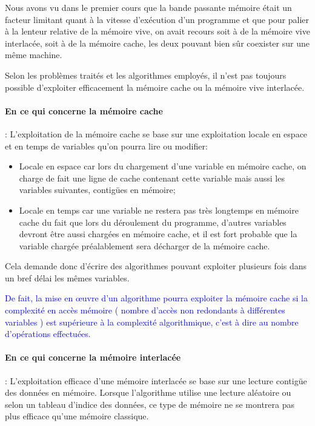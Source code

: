 \documentclass[fleqn,11pt]{article}
\begin{document}
Nous avons vu dans le premier cours que la bande passante mémoire était un facteur limitant quant à la vitesse d'exécution d'un
programme et que pour palier à la lenteur relative de la mémoire vive, on avait recours soit à de la mémoire vive interlacée, soit
à de la mémoire cache, les deux pouvant bien sûr coexister sur une même machine.

Selon les problèmes traités et les algorithmes employés, il n'est pas toujours possible d'exploiter efficacement la mémoire cache ou
la mémoire vive interlacée.

\paragraph{En ce qui concerne la mémoire cache} : L'exploitation de la mémoire cache se base sur une exploitation locale en espace et en temps
de variables qu'on pourra lire ou modifier:
\begin{itemize}
 \item Locale en espace car lors du chargement d'une variable en mémoire cache, on charge de fait une ligne de cache
 contenant cette variable mais aussi les variables suivantes, contigües en mémoire;
 \item Locale en temps  car une variable ne restera pas très longtemps en mémoire cache du fait que lors du déroulement du programme,
 d'autres variables devront être aussi chargées en mémoire cache, et il est fort probable que la variable chargée préalablement sera
 décharger de la mémoire cache.
\end{itemize}

Cela demande donc d'écrire des algorithmes pouvant exploiter plusieurs fois dans un bref délai les mêmes variables.

\textcolor{blue}{De fait, la mise en {\oe}uvre d'un algorithme pourra exploiter la mémoire cache si la complexité en accès
mémoire ( nombre d'accès non redondants à différentes variables ) 
est supérieure à la complexité algorithmique, c'est à dire au nombre d'opérations effectuées.}

\paragraph{En ce qui concerne la mémoire interlacée} : L'exploitation efficace d'une mémoire interlacée se base sur une lecture
contigüe des données en mémoire. Lorsque l'algorithme utilise une lecture aléatoire ou selon un tableau d'indice des données,
ce type de mémoire ne se montrera pas plus efficace qu'une mémoire classique.
\end{document}
